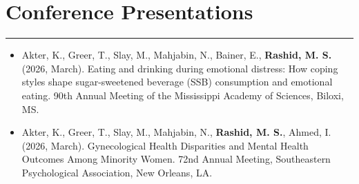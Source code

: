 \documentclass[10pt, a4paper]{article}
\begin{document}
\section*{Conference Presentations}\vspace{-2pt}\hrule\vspace{6pt}
\begin{itemize}
    \item Akter, K., Greer, T., Slay, M., Mahjabin, N., Bainer, E., \textbf{Rashid, M. S.} (2026, March). Eating and drinking during emotional distress: How coping styles shape sugar-sweetened beverage (SSB) consumption and emotional eating. 90th Annual Meeting of the Mississippi Academy of Sciences, Biloxi, MS.
    
    \item Akter, K., Greer, T., Slay, M., Mahjabin, N., \textbf{Rashid, M. S.}, Ahmed, I. (2026, March). Gynecological Health Disparities and Mental Health Outcomes Among Minority Women. 72nd Annual Meeting, Southeastern Psychological Association, New Orleans, LA.
\end{itemize}

\end{document}
